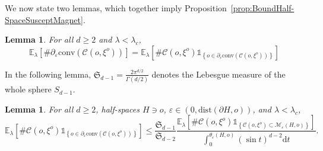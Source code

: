 \documentclass[10pt,a4paper,dvipsnames]{article}
\newtheorem{lemma}[theorem]{Lemma}
\theoremstyle{definition}
\theoremstyle{remark}
\newcommand{\ela}{\mathbb E_{\lambda}}
\newcommand{\Mcal}{\mathcal{M}}
\newcommand{\dd}{\mathrm{d}} %
\newcommand{\C}{\mathscr {C}}
\newcommand{\convex}[1]{{\mathrm{conv}\left(#1\right)}}
\newcommand{\Id}{\mathds 1}
\newcommand{\dist}[1]{\mathrm{dist}\left(#1\right)}
\newcommand{\orig}{o}
\numberwithin{equation}{section}
\begin{document}
We now state two lemmas, which together imply Proposition~\ref{prop:BoundHalf-SpaceSusceptMagnet}.

\begin{lemma}
\label{lem:numboundaryequalsgivenorigboundary}
    For all $d\geq 2$ and $\lambda<\lambda_c$,
    \begin{equation}
    \label{eqn:convHulltoclustersize}
        \ela\left[\#\partial_\varepsilon\convex{\C\left(\orig,\xi^{\orig}\right)}\right] = \ela\left[\#\C\left(\orig,\xi^{\orig}\right)\Id_{\left\{\orig\in\partial_\varepsilon\convex{\C\left(\orig,\xi^{\orig}\right)}\right\}}\right]
    \end{equation}
\end{lemma}



In the following lemma, $\mathfrak{S}_{d-1}=\frac{2\pi^{d/2}}{\Gamma(d/2)}$ denotes the Lebesgue measure of the whole sphere $S_{d-1}$.
\begin{lemma}\label{lem:rotationFactor}
    For all $d\geq 2$, half-spaces $H\ni\orig$, $\varepsilon\in\left(0,\dist{\partial H,\orig}\right)$, and $\lambda<\lambda_c$,
    \begin{equation}
        \ela\left[\#\C\left(\orig,\xi^{\orig}\right)\Id_{\left\{\orig\in\partial_\varepsilon\convex{\C\left(\orig,\xi^{\orig}\right)}\right\}}\right] \leq \frac{\mathfrak{S}_{d-1}}{\mathfrak{S}_{d-2}}\frac{\ela\left[\#\C\left(\orig,\xi^{\orig}\right) \Id_{\left\{\C\left(\orig,\xi^{\orig}\right)\subset\Mcal_\varepsilon\left( H,\orig\right)\right\}}\right]}{\int^{\theta_\varepsilon\left(H,\orig\right)}_0\left(\sin t\right)^{d-2}\dd t}.
    \end{equation}
\end{lemma}
\end{document}
